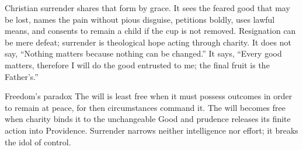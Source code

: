 Christian surrender shares that form by grace. It sees the feared good that may be lost, names the pain without pious disguise, petitions boldly, uses lawful means, and consents to remain a child if the cup is not removed. Resignation can be mere defeat; surrender is theological hope acting through charity. It does not say, ``Nothing matters because nothing can be changed.'' It says, ``Every good matters, therefore I will do the good entrusted to me; the final fruit is the Father's.''

\begin{studybox}{Freedom's paradox}
The will is least free when it must possess outcomes in order to remain at peace, for then circumstances command it. The will becomes free when charity binds it to the unchangeable Good and prudence releases its finite action into Providence. Surrender narrows neither intelligence nor effort; it breaks the idol of control.
\end{studybox}
